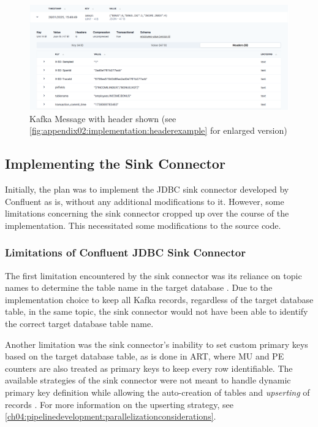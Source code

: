 \begin{figure}[htbp]
 \centering
 \includegraphics[width=1\textwidth]{chapters/images/header-example.png}
 \caption[Kafka Message with header shown]{Kafka Message with header shown (see \ref{fig:appendix02:implementation:headerexample} for enlarged version)}
 \label{fig:chapter04:implementation:headerexample}
\end{figure}


\subsection{Implementing the Sink Connector}
Initially, the plan was to implement the \ac{JDBC} sink connector developed by Confluent as is, without any additional modifications to it. However, some limitations concerning the sink connector cropped up over the course of the implementation. This necessitated some modifications to the source code.

\subsubsection{Limitations of Confluent JDBC Sink Connector}
The first limitation encountered by the sink connector was its reliance on topic names to determine the table name in the target database \cite{jdbcsinkdocumentation}. Due to the implementation choice to keep all Kafka records, regardless of the target database table, in the same topic, the sink connector would not have been able to identify the correct target database table name.

Another limitation was the sink connector's inability to set custom primary keys based on the target database table, as is done in \ac{ART}, where MU and PE counters are also treated as primary keys to keep every row identifiable. The available strategies of the sink connector were not meant to handle dynamic primary key definition while allowing the auto-creation of tables and \textit{upserting} of records \cite{jdbcsinkdocumentation}. For more information on the upserting strategy, see \ref{ch04:pipelinedevelopment:parallelizationconsiderations}.

